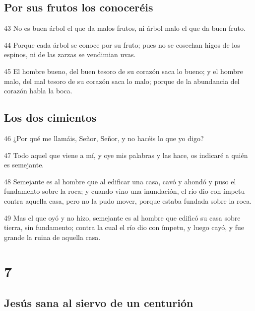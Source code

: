 \section*{Por sus frutos los conoceréis}

\par 43 No es buen árbol el que da malos frutos, ni árbol malo el que da buen fruto.
\par 44 Porque cada árbol se conoce por su fruto; pues no se cosechan higos de los espinos, ni de las zarzas se vendimian uvas.
\par 45 El hombre bueno, del buen tesoro de su corazón saca lo bueno; y el hombre malo, del mal tesoro de su corazón saca lo malo; porque de la abundancia del corazón habla la boca.

\section*{Los dos cimientos}

\par 46 ¿Por qué me llamáis, Señor, Señor, y no hacéis lo que yo digo?
\par 47 Todo aquel que viene a mí, y oye mis palabras y las hace, os indicaré a quién es semejante.
\par 48 Semejante es al hombre que al edificar una casa, cavó y ahondó y puso el fundamento sobre la roca; y cuando vino una inundación, el río dio con ímpetu contra aquella casa, pero no la pudo mover, porque estaba fundada sobre la roca.
\par 49 Mas el que oyó y no hizo, semejante es al hombre que edificó su casa sobre tierra, sin fundamento; contra la cual el río dio con ímpetu, y luego cayó, y fue grande la ruina de aquella casa.

\chapter{7}

\section*{Jesús sana al siervo de un centurión}

